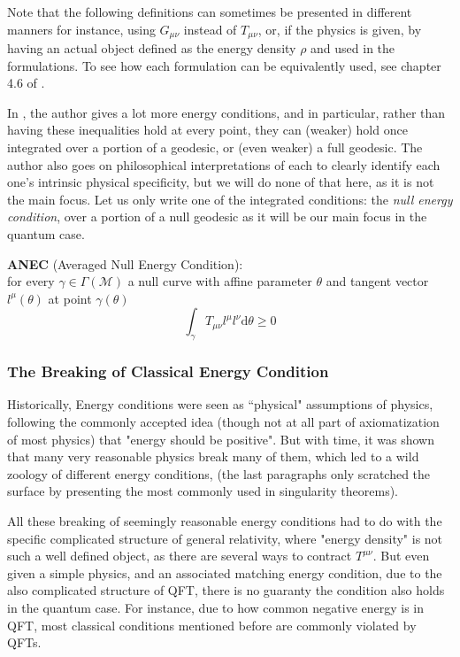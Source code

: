 \documentclass[a4paper,11pt]{article}
\numberwithin{equation}{section}
\theoremstyle{definition}
\renewcommand{\d}{{\mathrm{d}}}
\begin{document}
Note that the following definitions can sometimes be presented in different manners for instance, using $G_{\mu\nu}$ instead of $T_{\mu\nu}$, or, if the physics is given, by having an actual object defined as the energy density $\rho$ and used in the formulations. To see how each formulation can be equivalently used, see chapter 4.6 of \cite{E_Cond}.

In \cite{Primer}, the author gives a lot more energy conditions, and in particular, rather than having these inequalities hold at every point, they can (weaker) hold once integrated over a portion of a geodesic, or (even weaker) a full geodesic. The author also goes on philosophical interpretations of each to clearly identify each one's intrinsic physical specificity, but we will do none of that here, as it is not the main focus. Let us only write one of the integrated conditions: the \emph{null energy condition}, over a portion of a null geodesic as it will be our main focus in the quantum case.

\textbf{ANEC} (Averaged Null Energy Condition):\\
for every $\gamma\in\Gamma(\mathcal{M})$ a null curve with affine parameter $\theta$ and tangent vector $l^\mu(\theta)$ at point $\gamma(\theta)$
\begin{equation}
    \int_\gamma T_{\mu\nu}l^\mu l^\nu\d\theta \geq 0
\end{equation}
\subsubsection{The Breaking of Classical Energy Condition}
Historically, Energy conditions were seen as ``physical" assumptions of physics, following the commonly accepted idea (though not at all part of axiomatization of most physics) that "energy should be positive". But with time, it was shown that many very reasonable physics break many of them, which led to a wild zoology of different energy conditions, (the last paragraphs only scratched the surface by presenting the most commonly used in singularity theorems).

All these breaking of seemingly reasonable energy conditions had to do with the specific complicated structure of general relativity, where "energy density" is not such a well defined object, as there are several ways to contract $T^{\mu\nu}$. But even given a simple physics, and an associated matching energy condition, due to the also complicated structure of QFT, there is no guaranty the condition also holds in the quantum case. For instance, due to how common negative energy is in QFT, most classical conditions mentioned before are commonly violated by QFTs.
\end{document}
